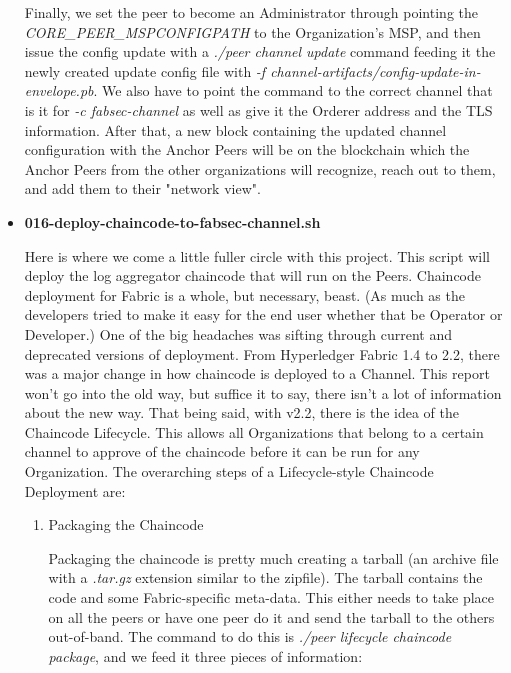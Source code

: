 \begin{itemize}
					\hspace{10mm}Finally, we set the peer to become an Administrator through pointing the \textit{CORE\_PEER\_MSPCONFIGPATH} to the Organization's MSP, and then issue the config update with a \textit{./peer channel update} command feeding it the newly created update config file with \textit{-f channel-artifacts/config-update-in-envelope.pb}. We also have to point the command to the correct channel that is it for \textit{-c fabsec-channel} as well as give it the Orderer address and the TLS information. After that, a new block containing the updated channel configuration with the Anchor Peers will be on the blockchain which the Anchor Peers from the other organizations will recognize, reach out to them, and add them to their "network view".
					
				\item \textbf{016-deploy-chaincode-to-fabsec-channel.sh}
					
					\hspace{10mm}Here is where we come a little fuller circle with this project. This script will deploy the log aggregator chaincode that will run on the Peers. Chaincode deployment for Fabric is a whole, but necessary, beast. (As much as the developers tried to make it easy for the end user whether that be Operator or Developer.) One of the big headaches was sifting through current and deprecated versions of deployment. From Hyperledger Fabric 1.4 to 2.2, there was a major change in how chaincode is deployed to a Channel. This report won't go into the old way, but suffice it to say, there isn't a lot of information about the new way. That being said, with v2.2, there is the idea of the Chaincode Lifecycle. This allows all Organizations that belong to a certain channel to approve of the chaincode before it can be run for any Organization. The overarching steps of a Lifecycle-style Chaincode Deployment are:
					
						\begin{enumerate}
							\item Packaging the Chaincode
							
								\hspace{10mm}Packaging the chaincode is pretty much creating a tarball (an archive file with a \textit{.tar.gz} extension similar to the zipfile). The tarball contains the code and some Fabric-specific meta-data. This either needs to take place on all the peers or have one peer do it and send the tarball to the others out-of-band. The command to do this is \textit{./peer lifecycle chaincode package}, and we feed it three pieces of information:
								

\end{enumerate}
\end{itemize}
